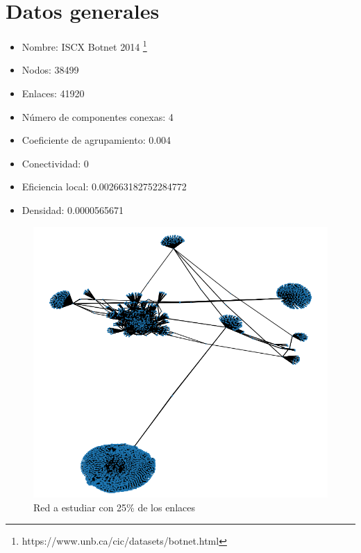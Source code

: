 \documentclass{article}
\begin{document}
    \section*{Datos generales}

    \begin{itemize}
        \item Nombre: ISCX Botnet 2014 
        \footnote{https://www.unb.ca/cic/datasets/botnet.html}

        \item Nodos: 38499

        \item Enlaces: 41920

        \item Número de componentes conexas: 4

        \item Coeficiente de agrupamiento: 0.004

        \item Conectividad: 0

        \item Eficiencia local: 0.002663182752284772

        \item Densidad: 0.0000565671
    \end{itemize}

    \begin{figure}
        \centering
        \includegraphics[scale=0.75]{net25.png}
        \caption{Red a estudiar con 25\% de los enlaces}
        \label{fig:net25}
    \end{figure}
\end{document}
